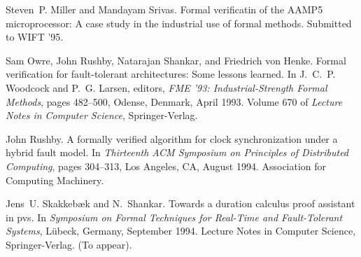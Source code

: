 \begin{thebibliography}{10}
Steven~P. Miller and Mandayam Srivas.
\newblock Formal verificatin of the {AAMP5} microprocessor: A case study in the
  industrial use of formal methods.
\newblock Submitted to WIFT '95.

Sam Owre, John Rushby, Natarajan Shankar, and Friedrich von Henke.
\newblock Formal verification for fault-tolerant architectures: Some lessons
  learned.
\newblock In J.~C.~P. Woodcock and P.~G. Larsen, editors, {\em FME '93:
  Industrial-Strength Formal Methods}, pages 482--500, Odense, Denmark, April
  1993. Volume 670 of {\em Lecture Notes in Computer Science}, Springer-Verlag.

John Rushby.
\newblock A formally verified algorithm for clock synchronization under a
  hybrid fault model.
\newblock In {\em Thirteenth ACM Symposium on Principles of Distributed
  Computing}, pages 304--313, Los Angeles, CA, August 1994. Association for
  Computing Machinery.

Jens~U. Skakkeb{\ae}k and N.~Shankar.
\newblock Towards a duration calculus proof assistant in pvs.
\newblock In {\em Symposium on Formal Techniques for Real-Time and
  Fault-Tolerant Systems}, L\"{u}beck, Germany, September 1994. Lecture Notes
  in Computer Science, Springer-Verlag.
\newblock (To appear).

\end{thebibliography}


